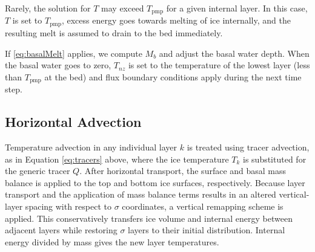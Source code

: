 


Rarely, the solution for $T$ may exceed $T_{\mathrm{pmp}}$ for a given internal layer. In this case, $T$ is set to $T_{\mathrm{pmp}}$, excess energy goes towards melting of ice internally, and the resulting melt is assumed to drain to the bed immediately.

If \eqref{eq:basalMelt} applies, we compute $M_b$ and adjust the basal water depth.
When the basal water goes to zero, $T_{nz}$ is set to
the temperature of the lowest layer (less than $T_{\mathrm{pmp}}$ at the bed) and flux boundary conditions apply during the next time step.

\subsection{Horizontal Advection}
\label{sec:Tadvect}

Temperature advection in any individual layer $k$ is treated using tracer advection, as in Equation \ref{eq:tracers} above, where the ice temperature  $T_k$ is substituted for the generic tracer $Q$. After horizontal transport, the surface and basal mass balance is applied to the top and bottom ice surfaces, respectively. Because layer transport and the application of mass balance terms results in an altered vertical-layer spacing with respect to $\sigma$ coordinates, a vertical remapping scheme is applied. This conservatively transfers ice volume and internal energy between adjacent layers while restoring $\sigma$ layers to their initial distribution. Internal energy divided by mass gives the new layer temperatures.



